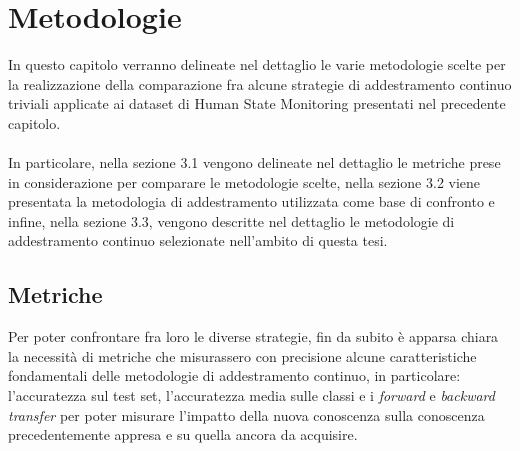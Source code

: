 \chapter{Metodologie}
In questo capitolo verranno delineate nel dettaglio le varie metodologie scelte per la realizzazione della comparazione fra alcune strategie di addestramento continuo triviali applicate ai dataset di Human State Monitoring presentati nel precedente capitolo.\\\\
In particolare, nella sezione 3.1 vengono delineate nel dettaglio le metriche prese in considerazione per comparare le metodologie scelte, nella sezione 3.2 viene presentata la metodologia di addestramento utilizzata come base di confronto e infine, nella sezione 3.3, vengono descritte nel dettaglio le metodologie di addestramento continuo selezionate nell'ambito di questa tesi.
\section{Metriche}
Per poter confrontare fra loro le diverse strategie, fin da subito è apparsa chiara la necessità di metriche che misurassero con precisione alcune caratteristiche fondamentali delle metodologie di addestramento continuo, in particolare: l'accuratezza sul test set, l'accuratezza media sulle classi e i \textit{forward} e \textit{backward transfer} per poter misurare l'impatto della nuova conoscenza sulla conoscenza precedentemente appresa e su quella ancora da acquisire.
